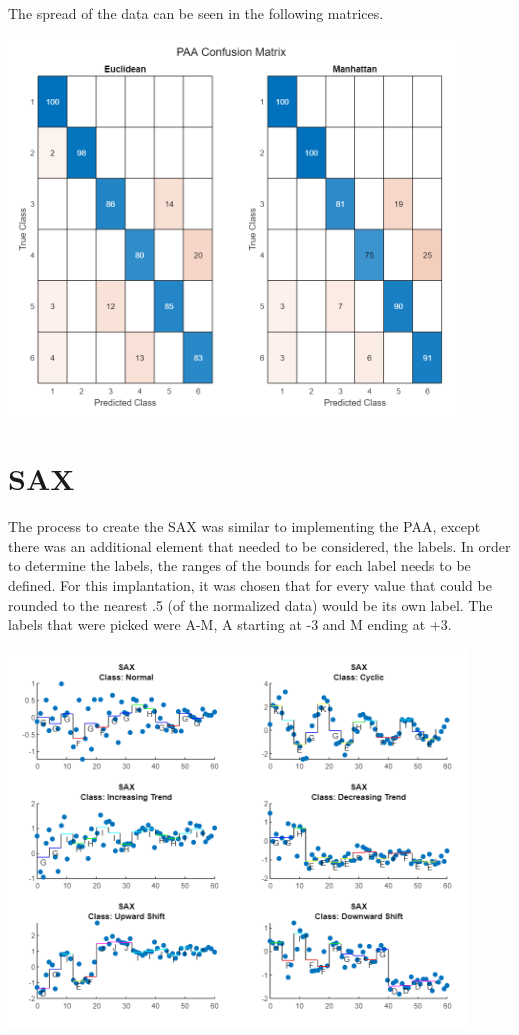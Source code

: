 \documentclass{article}
\begin{document}
The spread of the data can be seen in the following matrices.
\begin{center}
    {\includegraphics[height=10cm]{graphics/confusedpaa.png}\centering}
\end{center}


\section{SAX}
The process to create the SAX was similar to implementing the PAA, except there
was an additional element that needed to be considered, the labels.  In order to
determine the labels, the ranges of the bounds for each label needs to be defined.
For this implantation, it was chosen that for every value that could be rounded 
to the nearest .5 (of the normalized data) would be its own label.  The labels
that were picked were A-M, A starting at -3 and M ending at +3. 

\begin{center}
    {\includegraphics[height=10cm]{graphics/saxplot.png}\centering}
\end{center}
\end{document}

